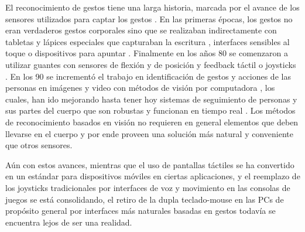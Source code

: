 El reconocimiento de gestos tiene una larga historia, marcada por el avance de los sensores utilizados para captar los gestos \cite{myers1998}. En las primeras épocas, los gestos no eran verdaderos gestos corporales sino que se realizaban indirectamente con tabletas y lápices especiales que capturaban la escritura \cite{davis1964,ellis1969,Coleman1969}, interfaces sensibles al toque \cite{madeira1978} o dispositivos para apuntar \cite{Bolt1980}. Finalmente en los años 80 se comenzaron a utilizar guantes con sensores de flexión y de posición y feedback táctil \cite{zimmerman1987} o joysticks \cite{pausch1992}. En los 90 se incrementó el trabajo en identificación de gestos y acciones de las personas en imágenes y video con métodos de visión por computadora \cite{tamura1988,yamato1992}, los cuales, han ido mejorando hasta tener hoy sistemas de seguimiento de personas y sus partes del cuerpo que son robustas y funcionan en tiempo real \cite{Shotton2011}. Los métodos de reconocimiento basados en visión no requieren en general elementos que deben llevarse en el cuerpo y por ende proveen una solución más natural y conveniente que otros sensores.  

Aún con estos avances, mientras que el uso de pantallas táctiles se ha convertido en un estándar para dispositivos móviles en ciertas aplicaciones, y el reemplazo de los joysticks tradicionales por interfaces de voz y movimiento en las consolas de juegos se está consolidando, el retiro de la dupla teclado-mouse en las PCs de propósito general por interfaces más naturales basadas en gestos todavía se encuentra lejos de ser una realidad. 


